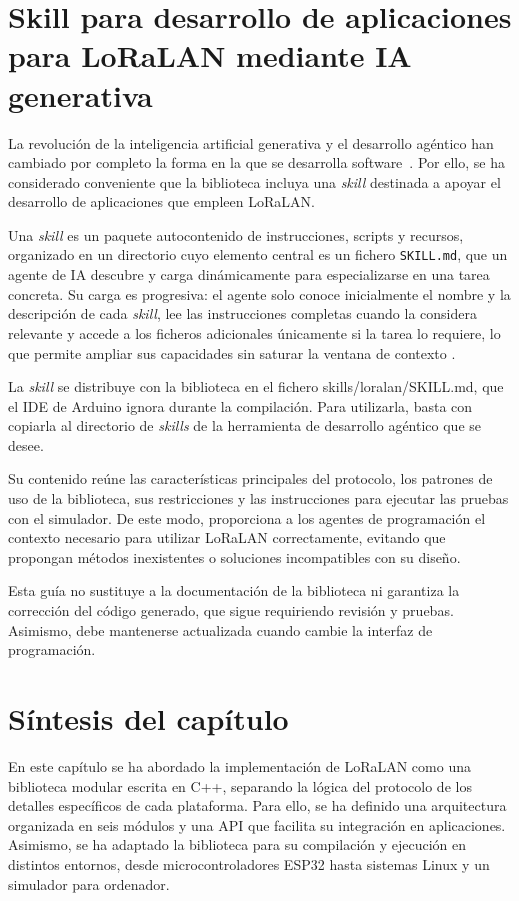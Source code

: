 \section{Skill para desarrollo de aplicaciones para LoRaLAN mediante IA generativa}\label{sec:skill}

La revolución de la inteligencia artificial generativa y el desarrollo agéntico han cambiado por completo la forma en la que se desarrolla software~\cite{willison2026agentic}. Por ello, se ha considerado conveniente que la biblioteca incluya una \textit{skill} destinada a apoyar el desarrollo de aplicaciones que empleen LoRaLAN.

Una \textit{skill} es un paquete autocontenido de instrucciones, scripts y
recursos, organizado en un directorio cuyo elemento central es un fichero
\texttt{SKILL.md}, que un agente de IA descubre y carga dinámicamente para
especializarse en una tarea concreta. Su carga es progresiva: el agente solo
conoce inicialmente el nombre y la descripción de cada \textit{skill}, lee las
instrucciones completas cuando la considera relevante y accede a los ficheros
adicionales únicamente si la tarea lo requiere, lo que permite ampliar sus
capacidades sin saturar la ventana de contexto \cite{anthropic2025skills}.

La \textit{skill} se distribuye con la biblioteca en el fichero skills/loralan/SKILL.md, que el IDE de Arduino ignora durante la compilación. Para utilizarla, basta con copiarla al directorio de \textit{skills} de la herramienta de desarrollo agéntico que se desee.

Su contenido reúne las características principales del protocolo, los patrones de uso de la biblioteca, sus restricciones y las instrucciones para ejecutar las pruebas con el simulador. De este modo, proporciona a los agentes de programación el contexto necesario para utilizar LoRaLAN correctamente, evitando que propongan métodos inexistentes o soluciones incompatibles con su diseño.

Esta guía no sustituye a la documentación de la biblioteca ni garantiza la corrección del código generado, que sigue requiriendo revisión y pruebas. Asimismo, debe mantenerse actualizada cuando cambie la interfaz de programación.


\section{Síntesis del capítulo}

En este capítulo se ha abordado la implementación de LoRaLAN como una biblioteca modular escrita en C++, separando la lógica del protocolo de los detalles específicos de cada plataforma. Para ello, se ha definido una arquitectura organizada en seis módulos y una API que facilita su integración en aplicaciones. Asimismo, se ha adaptado la biblioteca para su compilación y ejecución en distintos entornos, desde microcontroladores ESP32 hasta sistemas Linux y un simulador para ordenador.

